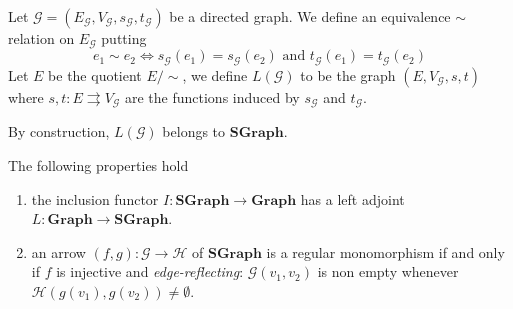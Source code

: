 \documentclass[runningheads,envcountsect]{lmcs}
\newcommand{\gr}{\catname{Graph}}
\newcommand{\dgr}{\catname{SGraph}}
\newcommand{\catname}[1]{\mathbf{#1}}
\theoremstyle{plain}
\theoremstyle{definition}
\begin{document}
\begin{defi}Let $\mathcal{{G}}=(E_\mathcal{{G}}, V_\mathcal{{G}}, s_\mathcal{{G}}, t_\mathcal{{G}})$ be a directed graph. We define an equivalence $\sim$ relation on $E_\mathcal{{G}}$ putting 
	\[e_1\sim e_2 \iff s_\mathcal{{G}}(e_1)=s_\mathcal{{G}}(e_2) \text{ and } t_\mathcal{{G}}(e_1)=t_\mathcal{{G}}(e_2)\]
Let $E$ be the quotient $E/\sim$, we define $L(\mathcal{{G}})$ to be the graph $(E,V_\mathcal{{G}}, s,t)$ where $s,t:E\rightrightarrows V_\mathcal{{G}}$ are the functions induced by $s_\mathcal{{G}}$ and $t_\mathcal{{G}}$.
\end{defi}

\begin{rem}By construction, $L(\mathcal{{G}})$ belongs to $\dgr$.
\end{rem}

\begin{prop}\label{prop:fatt}
	The following properties hold
	\begin{enumerate}
		\item the inclusion functor $I:\dgr\rightarrow \gr$ has a left adjoint $L:\gr\rightarrow \dgr$.
		\item an arrow $(f,g):\mathcal{{G}}\rightarrow \mathcal{{H}}$ of $\dgr$ is a regular monomorphism if and only if $f$ is injective and \emph{edge-reflecting}: $\mathcal{{G}}(v_1, v_2)$ is non empty whenever $\mathcal{{H}}(g(v_1), g(v_2))\neq \emptyset$.
	\end{enumerate}
\end{prop}
\end{document}
